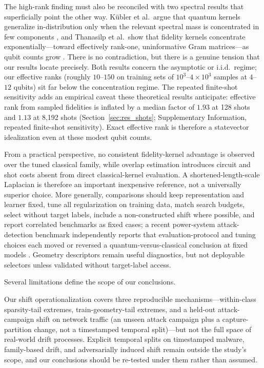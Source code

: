 \documentclass[referee,lineno,pdflatex,sn-vancouver-num]{sn-jnl}
\theoremstyle{thmstyleone}%
\theoremstyle{thmstyletwo}%
\theoremstyle{thmstylethree}%
\begin{document}
The high-rank finding must also be reconciled with two spectral results that superficially point the other way. K\"ubler et al.\ argue that quantum kernels generalize in-distribution only when the relevant spectral mass is concentrated in few components \cite{kubler2021inductivebias}, and Thanasilp et al.\ show that fidelity kernels concentrate exponentially---toward effectively rank-one, uninformative Gram matrices---as qubit counts grow \cite{thanasilp2024concentration}. There is no contradiction, but there is a genuine tension that our results locate precisely. Both results concern the asymptotic or i.i.d.\ regime; our effective ranks (roughly $10$--$150$ on training sets of $10^3$--$4\times10^3$ samples at $4$--$12$ qubits) sit far below the concentration regime. The repeated finite-shot sensitivity adds an empirical caveat these theoretical results anticipate: effective rank from sampled fidelities is inflated by a median factor of $1.93$ at 128 shots and $1.13$ at 8,192 shots (Section~\ref{sec:res_shots}; Supplementary Information, repeated finite-shot sensitivity). Exact effective rank is therefore a statevector idealization even at these modest qubit counts.

From a practical perspective, no consistent fidelity-kernel advantage is observed over the tuned classical family, while overlap estimation introduces circuit and shot costs absent from direct classical-kernel evaluation. A shortened-length-scale Laplacian is therefore an important inexpensive reference, not a universally superior choice. More generally, comparisons should keep representation and learner fixed, tune all regularization on training data, match search budgets, select without target labels, include a non-constructed shift where possible, and report correlated benchmarks as fixed cases; a recent power-system attack-detection benchmark independently reports that evaluation-protocol and tuning choices each moved or reversed a quantum-versus-classical conclusion at fixed models \cite{islam2026benchmarking}. Geometry descriptors remain useful diagnostics, but not deployable selectors unless validated without target-label access.

Several limitations define the scope of our conclusions.

Our shift operationalization covers three reproducible mechanisms---within-class sparsity-tail extremes, train-geometry-tail extremes, and a held-out attack-campaign shift on network traffic (an unseen attack campaign plus a capture-partition change, not a timestamped temporal split)---but not the full space of real-world drift processes. Explicit temporal splits on timestamped malware, family-based drift, and adversarially induced shift remain outside the study's scope, and our conclusions should be re-tested under them rather than assumed.
\end{document}
